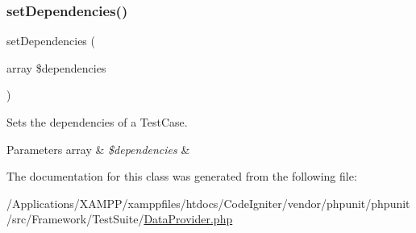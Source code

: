 \subsubsection{\texorpdfstring{set\+Dependencies()}{setDependencies()}}
{\footnotesize\ttfamily set\+Dependencies (\begin{DoxyParamCaption}\item[{array}]{\$dependencies }\end{DoxyParamCaption})}

Sets the dependencies of a Test\+Case.


\begin{DoxyParams}[1]{Parameters}
array & {\em \$dependencies} & \\
\hline
\end{DoxyParams}


The documentation for this class was generated from the following file\+:\begin{DoxyCompactItemize}
\item 
/\+Applications/\+X\+A\+M\+P\+P/xamppfiles/htdocs/\+Code\+Igniter/vendor/phpunit/phpunit/src/\+Framework/\+Test\+Suite/\mbox{\hyperlink{_data_provider_8php}{Data\+Provider.\+php}}\end{DoxyCompactItemize}
